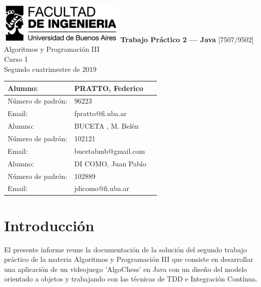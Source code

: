 \documentclass[titlepage,a4paper]{article}
\begin{document}
\begin{titlepage} %
	\hfill\includegraphics[width=6cm]{logofiuba.jpg}
    \centering
    \vfill
    \Huge \textbf{Trabajo Práctico 2 — Java}
    \vskip2cm
    \Large [7507/9502] Algoritmos y Programación III\\
    Curso 1 \\ %
    Segundo cuatrimestre de 2019 
    \vfill
    \begin{tabular}{ | l | l | l | } %
     
                
       \hline
      Alumno: & PRATTO, Federico \\ \hline
      Número de padrón: & 96223 \\ \hline
      Email: & fpratto@fi.uba.ar \\ \hline
     
      \hline
      Alumno: & BUCETA , M. Belén \\ \hline
      Número de padrón: & 102121 \\ \hline
      Email: & bucetabmb@gmail.com \\ \hline

       
      Alumno: & DI COMO, Juan Pablo \\ \hline
      Número de padrón: & 102889 \\ \hline
      Email: & jdicomo@fi.uba.ar \\ \hline  
      

  	\end{tabular}
    \vfill
    \vfill
\end{titlepage}

\tableofcontents %
\newpage

\section{Introducción}\label{sec:intro}
El presente informe reune la documentación de la solución del segundo trabajo práctico de la materia Algoritmos y Programación III que consiste en desarrollar una aplicación de un videojuego 'AlgoChess' en Java con un diseño del modelo orientado a objetos y trabajando con las técnicas de TDD e Integración Contínua.
\end{document}
